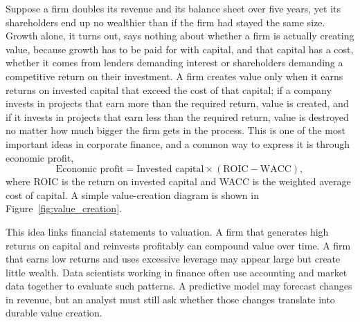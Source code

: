 \documentclass[../ai_in_finance]{subfiles}
\begin{document}
Suppose a firm doubles its revenue and its balance sheet over five years, yet its shareholders end up no wealthier than if the firm had stayed the same size. Growth alone, it turns out, says nothing about whether a firm is actually creating value, because growth has to be paid for with capital, and that capital has a cost, whether it comes from lenders demanding interest or shareholders demanding a competitive return on their investment. A firm creates value only when it earns returns on invested capital that exceed the cost of that capital; if a company invests in projects that earn more than the required return, value is created, and if it invests in projects that earn less than the required return, value is destroyed no matter how much bigger the firm gets in the process. This is one of the most important ideas in corporate finance, and a common way to express it is through economic profit,
\begin{equation*}
\text{Economic profit} = \text{Invested capital} \times (\text{ROIC} - \text{WACC}),
\end{equation*}
where ROIC is the return on invested capital and WACC is the weighted average cost of capital. A simple value-creation diagram is shown in Figure~\ref{fig:value_creation}.

\begin{figure}[htbp]
\centering
\begin{lrbox}{\bookmeasuredbox}
\end{lrbox}
\ifdim\wd\bookmeasuredbox<0.65\linewidth
\setlength{\bookcapwidth}{0.65\linewidth}
\else
\setlength{\bookcapwidth}{\wd\bookmeasuredbox}
\fi
{}
\end{figure}

This idea links financial statements to valuation. A firm that generates high returns on capital and reinvests profitably can compound value over time. A firm that earns low returns and uses excessive leverage may appear large but create little wealth. Data scientists working in finance often use accounting and market data together to evaluate such patterns. A predictive model may forecast changes in revenue, but an analyst must still ask whether those changes translate into durable value creation.
\end{document}
